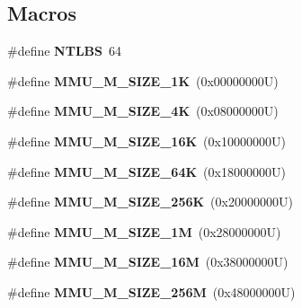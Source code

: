 \subsection*{Macros}
\begin{DoxyCompactItemize}
\item 
\mbox{\label{group__Virtex5MMU_ga6b9035b3670554050186b28fb406b05f}} 
\#define {\bfseries N\+T\+L\+BS}~64
\item 
\mbox{\label{group__Virtex5MMU_gaff12d131dbcb3e46046d9db338d01e5c}} 
\#define {\bfseries M\+M\+U\+\_\+\+M\+\_\+\+S\+I\+Z\+E\+\_\+1K}~(0x00000000\+U)
\item 
\mbox{\label{group__Virtex5MMU_ga9593e6212ae063429b9b637fec5236d1}} 
\#define {\bfseries M\+M\+U\+\_\+\+M\+\_\+\+S\+I\+Z\+E\+\_\+4K}~(0x08000000\+U)
\item 
\mbox{\label{group__Virtex5MMU_ga79970320e390936333d3604d9611a0ca}} 
\#define {\bfseries M\+M\+U\+\_\+\+M\+\_\+\+S\+I\+Z\+E\+\_\+16K}~(0x10000000\+U)
\item 
\mbox{\label{group__Virtex5MMU_ga62c568adff1815458791e45f3a6f54a1}} 
\#define {\bfseries M\+M\+U\+\_\+\+M\+\_\+\+S\+I\+Z\+E\+\_\+64K}~(0x18000000\+U)
\item 
\mbox{\label{group__Virtex5MMU_ga4416efcc6c3ad0d5f892f20133561f0f}} 
\#define {\bfseries M\+M\+U\+\_\+\+M\+\_\+\+S\+I\+Z\+E\+\_\+256K}~(0x20000000\+U)
\item 
\mbox{\label{group__Virtex5MMU_ga8d714512fdf6ad00cc927a1698e26d40}} 
\#define {\bfseries M\+M\+U\+\_\+\+M\+\_\+\+S\+I\+Z\+E\+\_\+1M}~(0x28000000\+U)
\item 
\mbox{\label{group__Virtex5MMU_gab5c598db590ccd9f369973d3aa897949}} 
\#define {\bfseries M\+M\+U\+\_\+\+M\+\_\+\+S\+I\+Z\+E\+\_\+16M}~(0x38000000\+U)
\item 
\mbox{\label{group__Virtex5MMU_ga4af47b3dc40f2051d13c0fff3b8f962e}} 
\#define {\bfseries M\+M\+U\+\_\+\+M\+\_\+\+S\+I\+Z\+E\+\_\+256M}~(0x48000000\+U)
\item 

\end{DoxyCompactItemize}
